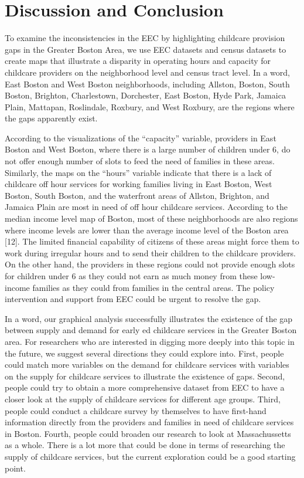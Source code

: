 \documentclass[10pt,letterpaper]{article}
\begin{document}
\section{Discussion and Conclusion}\label{discussion-and-conclusion}

To examine the inconsistencies in the EEC by highlighting childcare
provision gaps in the Greater Boston Area, we use EEC datasets and
census datasets to create maps that illustrate a disparity in operating
hours and capacity for childcare providers on the neighborhood level and
census tract level. In a word, East Boston and West Boston
neighborhoods, including Allston, Boston, South Boston, Brighton,
Charlestown, Dorchester, East Boston, Hyde Park, Jamaica Plain,
Mattapan, Roslindale, Roxbury, and West Roxbury, are the regions where
the gaps apparently exist.

According to the visualizations of the ``capacity'' variable, providers
in East Boston and West Boston, where there is a large number of
children under 6, do not offer enough number of slots to feed the need
of families in these areas. Similarly, the maps on the ``hours''
variable indicate that there is a lack of childcare off hour services
for working families living in East Boston, West Boston, South Boston,
and the waterfront areas of Allston, Brighton, and Jamaica Plain are
most in need of off hour childcare services. According to the median
income level map of Boston, most of these neighborhoods are also regions
where income levels are lower than the average income level of the
Boston area {[}12{]}. The limited financial capability of citizens of
these areas might force them to work during irregular hours and to send
their children to the childcare providers. On the other hand, the
providers in these regions could not provide enough slots for children
under 6 as they could not earn as much money from these low-income
families as they could from families in the central areas. The policy
intervention and support from EEC could be urgent to resolve the gap.

In a word, our graphical analysis successfully illustrates the existence
of the gap between supply and demand for early ed childcare services in
the Greater Boston area. For researchers who are interested in digging
more deeply into this topic in the future, we suggest several directions
they could explore into. First, people could match more variables on the
demand for childcare services with variables on the supply for childcare
services to illustrate the existence of gaps. Second, people could try
to obtain a more comprehensive dataset from EEC to have a closer look at
the supply of childcare services for different age groups. Third, people
could conduct a childcare survey by themselves to have first-hand
information directly from the providers and families in need of
childcare services in Boston. Fourth, people could broaden our research
to look at Massachussetts as a whole. There is a lot more that could be
done in terms of researching the supply of childcare services, but the
current exploration could be a good starting point.
\end{document}
